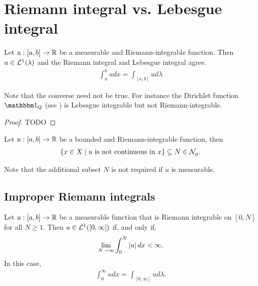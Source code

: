 \section{Riemann integral vs. Lebesgue integral}

\begin{thm}
	Let $u: [a, b] \to \mathbb{R}$ be a measurable and Riemann-integrable function. Then $u \in \mathcal{L}^1(\lambda)$ and the Riemann integral and Lebesgue integral agree.
	\begin{align}
		\int_a^b u dx = \int_{[a, b]} u d\lambda
	\end{align}
\end{thm}

\begin{remark}
	Note that the converse need not be true. For instance the Dirichlet function $\ind_{Q}$ (see \cite{dirichlet}) is Lebesgue integrable but not Riemann-integrable.
\end{remark}

\begin{proof}
	TODO
\end{proof}

\begin{thm}
	Let $u:[a, b] \to \mathbb{R}$ be a bounded and Riemann-integrable function, then
	\begin{align}
		\{x \in X \mid u \text{ is not continuous in } x\} \subseteq N \in \mathcal{N}_\mu.
	\end{align}
\end{thm}

Note that the additional subset $N$ is not required if $u$ is measurable.

\subsection{Improper Riemann integrals}

\begin{cor}
	Let $u:[a, b] \to \mathbb{R}$ be a measurable function that is Riemann integrable on $[0, N]$ for all $N\geq 1$. Then $u \in \mathcal{L}^1([0,\infty])$ if, and only if,
	\begin{align}
		\lim_{N\to\infty} \int_0^N \left\vert{u}\right\vert dx < \infty.
	\end{align}
	In this case,
	\begin{align*}
		\int_0^\infty udx = \int_{[0, \infty]} u d\lambda.
	\end{align*}
\end{cor}